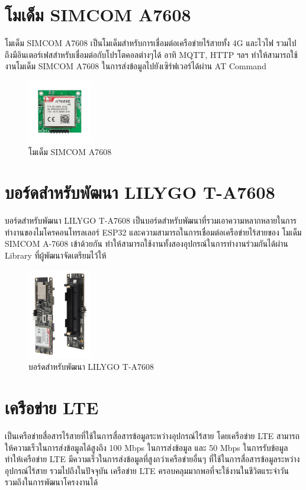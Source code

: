 \section{โมเด็ม SIMCOM A7608}
  โมเด็ม SIMCOM A7608 เป็นโมเด็มสำหรับการเชื่อมต่อเครือข่ายไร้สายทั้ง 4G และไวไฟ รวมไปถึงมีอินเตอร์เฟสสำหรับเชื่อมต่อกับโปรโตคอลต่างๆได้ อาทิ MQTT, HTTP ฯลฯ ทำให้สามารถใช้งานโมเด็ม SIMCOM A7608 ในการส่งข้อมูลไปยังเซิร์ฟเวอร์ได้ผ่าน AT Command
  \begin{figure}[h!]
    \begin{center}
      \includegraphics[width=0.25\textwidth]{simcom-a7608e-h.png}
    \end{center}
    \caption[Poem]{โมเด็ม SIMCOM A7608}
    \label{fig:simcom-a7608}
  \end{figure}

\section{บอร์ดสำหรับพัฒนา LILYGO T-A7608}
  บอร์ดสำหรับพัฒนา LILYGO T-A7608 เป็นบอร์ดสำหรับพัฒนาที่รวมเอาความหลากหลายในการทำงานของไมโครคอนโทรลเลอร์ ESP32 และความสามารถในการเชื่อมต่อเครือข่ายไร้สายของ โมเด็ม SIMCOM A-7608 เข้าด้วยกัน ทำให้สามารถใช้งานทั้งสองอุปกรณ์ในการทำงานร่วมกันได้ผ่าน Library ที่ผู้พัฒนาจัดเตรียมไว้ให้
  \begin{figure}[h!]
    \begin{center}
      \includegraphics[width=0.25\textwidth]{lilygo-t-a7608.png}
    \end{center}
    \caption[Poem]{บอร์ดสำหรับพัฒนา LILYGO T-A7608}
    \label{fig:lilygo-t-a7608}
  \end{figure}

\section{เครือข่าย LTE}
  \cite[เครือข่าย LTE (Long Term Evolution)]{lte} เป็นเครือข่ายสื่อสารไร้สายที่ใช้ในการสื่อสารข้อมูลระหว่างอุปกรณ์ไร้สาย โดยเครือข่าย LTE สามารถให้ความเร็วในการส่งข้อมูลได้สูงถึง 100 Mbps ในการส่งข้อมูล และ 50 Mbps ในการรับข้อมูล ทำให้เครือข่าย LTE มีความเร็วในการส่งข้อมูลที่สูงกว่าเครือข่ายอื่นๆ ที่ใช้ในการสื่อสารข้อมูลระหว่างอุปกรณ์ไร้สาย รวมไปถึงในปัจจุบัน เครือข่าย LTE ครอบคลุมมากพอที่จะใช้งานในชีวิตแระจำวัน รวมถึงในการพัฒนาโครงงานได้

